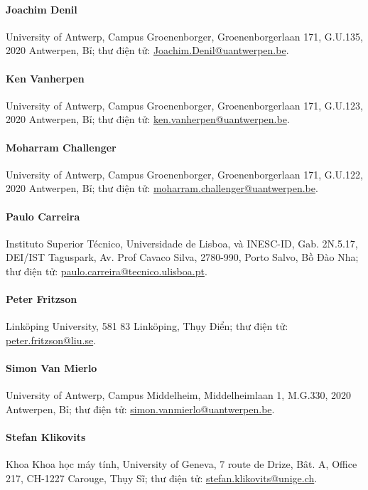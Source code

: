 \paragraph{Joachim Denil}
University of Antwerp, Campus Groenenborger, Groenenborgerlaan 171, G.U.135, 2020 Antwerpen, Bỉ; thư điện tử: \url{Joachim.Denil@uantwerpen.be}.

\paragraph{Ken Vanherpen}
University of Antwerp, Campus Groenenborger, Groenenborgerlaan 171, G.U.123, 2020 Antwerpen, Bỉ; thư điện tử: \url{ken.vanherpen@uantwerpen.be}.

\paragraph{Moharram Challenger}
University of Antwerp, Campus Groenenborger, Groenenborgerlaan 171, G.U.122, 2020 Antwerpen, Bỉ; thư điện tử: \url{moharram.challenger@uantwerpen.be}.

\paragraph{Paulo Carreira}
Instituto Superior Técnico, Universidade de Lisboa, và INESC-ID, Gab. 2N.5.17, DEI/IST Taguspark, Av. Prof Cavaco Silva, 2780-990, Porto Salvo, Bồ Đào Nha; thư điện tử: \url{paulo.carreira@tecnico.ulisboa.pt}.

\paragraph{Peter Fritzson}
Linköping University, 581 83 Linköping, Thụy Điển; thư điện tử: \url{peter.fritzson@liu.se}.

\paragraph{Simon Van Mierlo}
University of Antwerp, Campus Middelheim, Middelheimlaan 1, M.G.330, 2020 Antwerpen, Bỉ; thư điện tử: \url{simon.vanmierlo@uantwerpen.be}.

\paragraph{Stefan Klikovits}
Khoa Khoa học máy tính, University of Geneva, 7 route de Drize, Bât. A, Office 217, CH-1227 Carouge, Thụy Sĩ; thư điện tử: \url{stefan.klikovits@unige.ch}.

